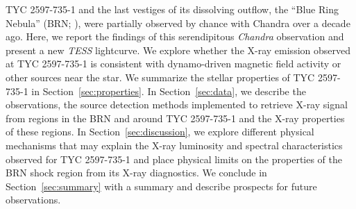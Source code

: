 \documentclass[]{aastex631}
\begin{document}
TYC 2597-735-1 and the last vestiges of its dissolving outflow, the ``Blue Ring Nebula'' (BRN; \citealt{2020Natur.587..387H}), were partially observed by chance with Chandra over a decade ago. Here, we report the findings of this serendipitous \emph{Chandra} observation and present a new \emph{TESS} lightcurve. We explore whether the X-ray emission observed at TYC 2597-735-1 is consistent with dynamo-driven magnetic field activity or other sources near the star. We summarize the stellar properties of TYC 2597-735-1 in Section~\ref{sec:properties}. In Section~\ref{sec:data}, we describe the observations, the source detection methods implemented to retrieve X-ray signal from regions in the BRN and around TYC 2597-735-1 and the X-ray properties of these regions. In Section~\ref{sec:discussion}, we explore different physical mechanisms that may explain the X-ray luminosity and spectral characteristics observed for TYC 2597-735-1 and place physical limits on the properties of the BRN shock region from its X-ray diagnostics. We conclude in Section~\ref{sec:summary} with a summary and describe prospects for future observations.



\end{document}
